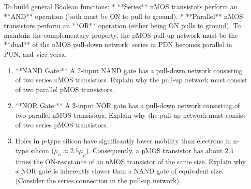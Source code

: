 \documentclass[12pt, a4paper]{book}
\begin{document}
\begin{explobox}
To build general Boolean functions:
* **Series** nMOS transistors perform an **AND** operation (both must be ON to pull to ground).
* **Parallel** nMOS transistors perform an **OR** operation (either being ON pulls to ground).
To maintain the complementary property, the pMOS pull-up network must be the **dual** of the nMOS pull-down network: series in PDN becomes parallel in PUN, and vice-versa.
\begin{center}
\end{center}
\begin{enumerate}[label=(\alph*), leftmargin=*]
  \item **NAND Gate:** A 2-input NAND gate has a pull-down network consisting of two series nMOS transistors.
        Explain why the pull-up network must consist of two parallel pMOS transistors.
  \item **NOR Gate:** A 2-input NOR gate has a pull-down network consisting of two parallel nMOS transistors.
        Explain why the pull-up network must consist of two series pMOS transistors.
  \item Holes in p-type silicon have significantly lower mobility than electrons in n-type silicon ($\mu_n \approx 2.5 \mu_p$). Consequently, a pMOS transistor has about $2.5$ times the ON-resistance of an nMOS transistor of the same size.
        Explain why a NOR gate is inherently slower than a NAND gate of equivalent size. (Consider the series connection in the pull-up network).
\end{enumerate}
\end{explobox}
\end{document}
